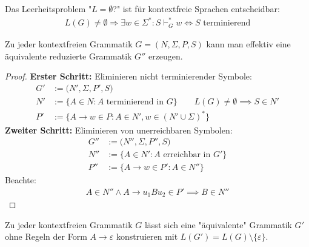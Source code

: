 \begin{satz}\label{satz8.5}
	Das Leerheitsproblem "$L=\emptyset$?" ist für kontextfreie Sprachen entscheidbar:
	\begin{align*}
		L(G)\neq\emptyset\Longrightarrow\exists w\in\Sigma^\ast:S\vdash_G^\ast w
		\Longleftrightarrow S\text{ terminierend}
	\end{align*}
\end{satz}

\begin{lemma}\label{lemma8.6}
	Zu jeder kontextfreien Grammatik $G=(N,\Sigma,P,S)$ kann man effektiv eine äquivalente reduzierte Grammatik $G''$ erzeugen.
\end{lemma}

\begin{proof}
	\textbf{Erster Schritt:} Eliminieren nicht terminierender Symbole:
	\begin{align*}
		G'&:=\big(N',\Sigma,P',S\big)\\
		N'&:=\big\lbrace A\in N:A\text{ terminierend in }G\big\rbrace\qquad L(G)\neq\emptyset\implies S\in N'\\
		P'&:=\big\lbrace A\to w\in P:A\in N',w\in(N'\cup\Sigma)^\ast\big\rbrace
	\end{align*}
	\textbf{Zweiter Schritt:} Eliminieren von unerreichbaren Symbolen:
	\begin{align*}
		G''&:=\big(N'',\Sigma,P'',S\big)\\
		N''&:=\big\lbrace A\in N':A\text{ erreichbar in }G'\big\rbrace\\
		P''&:=\big\lbrace A\to w\in P':A\in N''\big\rbrace
	\end{align*}
	Beachte:
	\begin{align*}
		A\in N''\wedge A\to u_1 Bu_2\in P'\implies B\in N''
	\end{align*}
\end{proof}

\begin{lemma}\label{lemma8.7}
	Zu jeder kontextfreien Grammatik $G$ lässt sich eine "äquivalente" Grammatik $G'$ ohne Regeln der Form $A\to\varepsilon$ konstruieren mit $L(G')=L(G)\setminus\lbrace\varepsilon\rbrace$.
\end{lemma}

